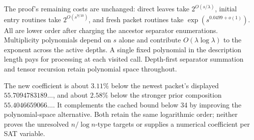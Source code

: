 The proof's remaining costs are unchanged: direct leaves take
$2^{O(s/\lambda)}$, initial entry routines take $2^{O(s^{9/10})}$, and fresh
packet routines take $\exp(s^{0.0499+o(1)})$. All are lower order after
charging the ancestor separator enumerations. Multiplicity polynomials
depend on $s$ alone and contribute $O(\lambda\log\lambda)$ to the exponent
across the active depths. A single fixed polynomial in the description
length pays for processing at each visited call. Depth-first separator
summation and tensor recursion retain polynomial space throughout.

The new coefficient is about $3.11\%$ below the newest packet's displayed
$55.7094783189\ldots$, and about $2.58\%$ below the stronger prior composition
$55.4046659066\ldots$. It complements the cached bound below 34 by improving
the polynomial-space alternative. Both retain the same logarithmic order;
neither proves the unresolved $n/\log n$-type targets or supplies a numerical
coefficient per SAT variable.
